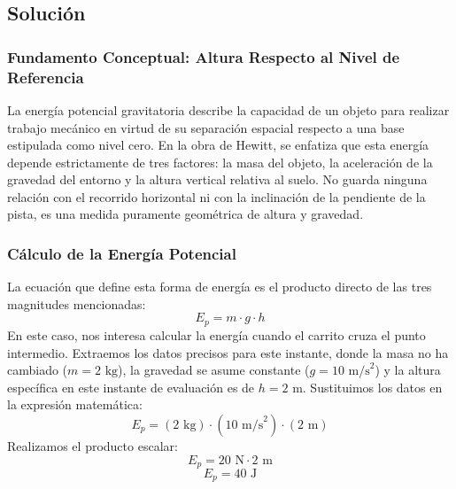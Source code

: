 \documentclass[12pt,a4paper]{article}
\begin{document}
\begin{center}
\end{center}

\subsection*{Solución}

\subsubsection*{Fundamento Conceptual: Altura Respecto al Nivel de Referencia}
La energía potencial gravitatoria describe la capacidad de un objeto para realizar trabajo mecánico en virtud de su separación espacial respecto a una base estipulada como nivel cero. En la obra de Hewitt, se enfatiza que esta energía depende estrictamente de tres factores: la masa del objeto, la aceleración de la gravedad del entorno y la altura vertical relativa al suelo. No guarda ninguna relación con el recorrido horizontal ni con la inclinación de la pendiente de la pista, es una medida puramente geométrica de altura y gravedad.

\subsubsection*{Cálculo de la Energía Potencial}
La ecuación que define esta forma de energía es el producto directo de las tres magnitudes mencionadas:
$$E_p = m \cdot g \cdot h$$
En este caso, nos interesa calcular la energía cuando el carrito cruza el punto intermedio. Extraemos los datos precisos para este instante, donde la masa no ha cambiado ($m = 2 \text{ kg}$), la gravedad se asume constante ($g = 10 \text{ m/s}^2$) y la altura específica en este instante de evaluación es de $h = 2 \text{ m}$.
Sustituimos los datos en la expresión matemática:
$$E_p = (2 \text{ kg}) \cdot (10 \text{ m/s}^2) \cdot (2 \text{ m})$$
Realizamos el producto escalar:
$$E_p = 20 \text{ N} \cdot 2 \text{ m}$$
$$E_p = 40 \text{ J}$$
\end{document}
